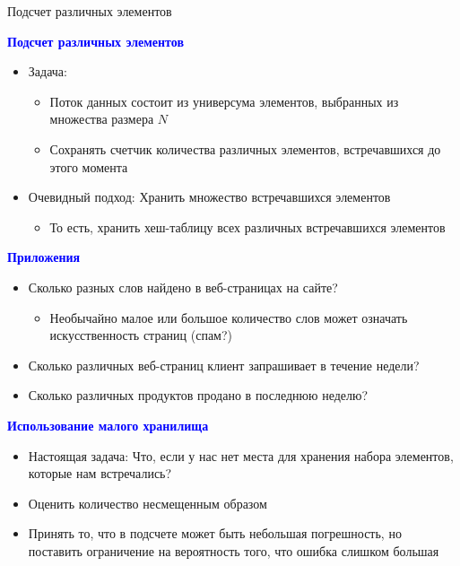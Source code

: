 \documentclass[landscape]{slides}
\begin{document}
\begin{normalsize}
\begin{slide}
Подсчет различных элементов
\end{slide}


\begin{slide}
\textbf{\textcolor{blue}{Подсчет различных элементов}}

\begin{itemize}
\item Задача:
  \begin{itemize}
  \item Поток данных состоит из универсума элементов, выбранных из множества размера $N$
  \item Сохранять счетчик количества различных элементов, встречавшихся до этого момента
  \end{itemize}
\item Очевидный подход:
  Хранить множество встречавшихся элементов
  \begin{itemize}
  \item То есть, хранить хеш-таблицу всех различных встречавшихся элементов
  \end{itemize}
\end{itemize}
\end{slide}

\begin{slide}
\textbf{\textcolor{blue}{Приложения}}

\begin{itemize}
\item Сколько разных слов найдено в веб-страницах на сайте?
  \begin{itemize}
  \item Необычайно малое или большое количество слов может означать искусственность страниц (спам?)
  \end{itemize}
\item Сколько различных веб-страниц клиент запрашивает в течение недели?
\item Сколько различных продуктов продано в последнюю неделю?
\end{itemize}
\end{slide}


\begin{slide}
\textbf{\textcolor{blue}{Использование малого хранилища}}

\begin{itemize}
\item Настоящая задача: Что, если у нас нет места для хранения набора элементов, которые нам встречались?
\item Оценить количество несмещенным образом
\item Принять то, что в подсчете может быть небольшая погрешность, но поставить ограничение на вероятность того, что ошибка слишком большая
\end{itemize}
\end{slide}



\end{normalsize}
\end{document}
